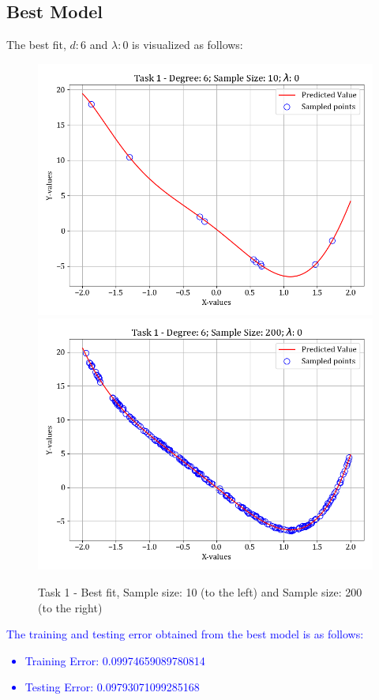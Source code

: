 \documentclass[12pt,a4paper]{article}
\newcommand{\noi}{\noindent}
\begin{document}
\subsection{Best Model}
The best fit, $d:6$ and $\lambda:0$ is visualized as follows:
\begin{figure}[H]
    \hspace{-2em}
    \includegraphics[scale=0.45]{images/t1_d1/d_6_size_10_l_0.png}
    \includegraphics[scale=0.45]{images/t1_d1/d_6_size_200_l_0.png}
    \caption{Task 1 - Best fit, Sample size: 10 (to the left) and Sample size: 200 (to the right)}
\end{figure}

\noi
\textcolor{blue}{
The training and testing error obtained from the best model is as follows:
\begin{itemize}
    \itemsep0em
    \item Training Error: 0.09974659089780814
    \item Testing Error: 0.09793071099285168
\end{itemize}
}
\end{document}
